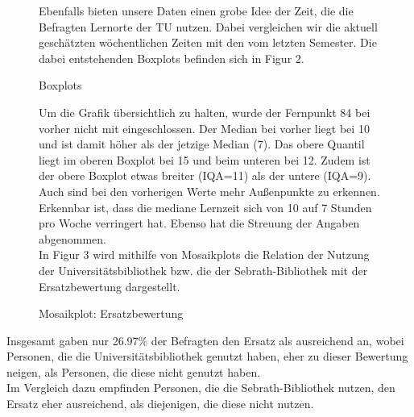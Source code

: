 \documentclass[11pt, a4paper]{article}
\begin{document}
\begin{figure}[htp]
	Ebenfalls bieten unsere Daten einen grobe Idee der Zeit, die die Befragten Lernorte der TU nutzen.
	Dabei vergleichen wir die aktuell geschätzten wöchentlichen Zeiten mit den vom letzten Semester.
	 Die dabei entstehenden Boxplots befinden sich in Figur 2.\\
	\vspace{-1.5cm}
	\hspace{-0.8cm}
	{\centering} 
	\vspace{0cm}
	\caption{Boxplots}
	\vspace{0.7cm}
	\raggedright
	Um die Grafik übersichtlich zu halten, wurde der Fernpunkt 84 bei vorher nicht mit eingeschlossen. 
	Der Median bei vorher liegt bei 10 und ist damit höher als der jetzige Median (7).
	Das obere Quantil liegt im oberen Boxplot bei 15 und beim unteren bei 12.
	Zudem ist der obere Boxplot etwas breiter (IQA=11) als der untere (IQA=9).
	Auch sind bei den vorherigen Werte mehr Außenpunkte zu erkennen.
	Erkennbar ist, dass die mediane Lernzeit sich von 10 auf 7 Stunden pro Woche verringert hat. Ebenso hat die Streuung der Angaben abgenommen.\\
	In Figur 3 wird mithilfe von Mosaikplots die Relation der Nutzung der Universitätsbibliothek bzw. die der Sebrath-Bibliothek mit der Ersatzbewertung dargestellt.
	\vspace{0.5cm}
	 \begin{center}
	{\centering } \end{center}
	\vspace{-1.5cm}
	\caption{Mosaikplot: Ersatzbewertung}
\end{figure}

\leavevmode
\newpage
Insgesamt gaben nur 26.97\% der Befragten den Ersatz als ausreichend an, wobei Personen, die die Universitätsbibliothek genutzt haben, eher zu dieser Bewertung neigen, als Personen, die diese nicht genutzt haben. \\ %
Im Vergleich dazu empfinden Personen, die die Sebrath-Bibliothek nutzen, den Ersatz eher ausreichend, als diejenigen, die diese nicht nutzen. %
\end{document}
